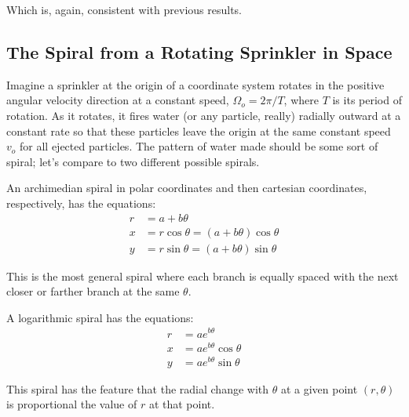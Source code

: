 \documentclass[10pt]{article}
\begin{document}
Which is, again, consistent with previous results.

\subsection{The Spiral from a Rotating Sprinkler in Space}

Imagine a sprinkler at the origin of a coordinate system rotates in the 
positive angular velocity direction at a constant speed, $\Omega_o = 2\pi/T$, 
where $T$ is its period of rotation. As it rotates, it fires 
water (or any particle, really) radially outward 
at a constant rate so that these 
particles leave the origin at the same constant speed
$v_o$ for all ejected particles. The pattern of water made 
should be some sort of spiral; let's compare to two different possible spirals.

An archimedian spiral in polar coordinates and then 
cartesian coordinates, respectively, has the equations:
\begin{align}
    r &= a + b\theta \\
    x & = r\cos\theta = (a + b\theta)\cos\theta \\
    y & = r\sin\theta = (a + b\theta)\sin\theta
\end{align}

\begin{figure}[H]
\begin{center}
\end{center}
\end{figure}
This is the most general spiral where each branch is equally spaced with 
the next closer or farther branch at the same $\theta$.

A logarithmic spiral has the equations:
\begin{align}
    r &=a e^{b\theta} \\
    x &= a e^{b\theta}\cos\theta \\
    y &= a e^{b\theta}\sin\theta
\end{align}

\begin{figure}[H]
\begin{center}
\end{center}
\end{figure}
This spiral has the feature that the radial change with $\theta$ at a given 
point $(r,\theta)$ is proportional the value of $r$ at that point.
\end{document}
